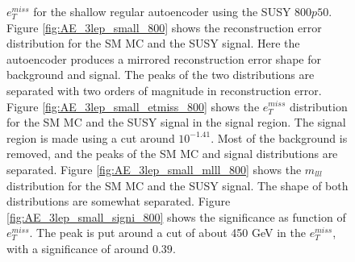 \begin{figure}[h!]
{    $e_T^{miss}$ for the shallow regular autoencoder using the SUSY $800p50$. 
    Figure \ref{fig:AE_3lep_small_800} shows the reconstruction error 
    distribution for the SM MC and the SUSY signal. Here the autoencoder produces a mirrored reconstruction error shape for background and 
    signal. The peaks of the two distributions are separated with two orders of magnitude in reconstruction error. Figure \ref{fig:AE_3lep_small_etmiss_800} 
    shows the $e_T^{miss}$ distribution for the SM MC and the SUSY signal in the signal region. 
    The signal region is made using a cut around $10^{-1.41}$. Most of the background is removed, and the peaks of the SM MC and signal 
    distributions are separated. Figure \ref{fig:AE_3lep_small_mlll_800} shows the $m_{lll}$ distribution for the SM MC and the SUSY signal. 
    The shape of both distributions are somewhat separated. Figure \ref{fig:AE_3lep_small_signi_800} shows the significance as function of
    $e_T^{miss}$. The peak is put around a cut of about 450 GeV in the $e_T^{miss}$, with a significance of around $0.39$.}
    \label{fig:AE_3lep_small_rec_sig_signi_800}
\end{figure}

